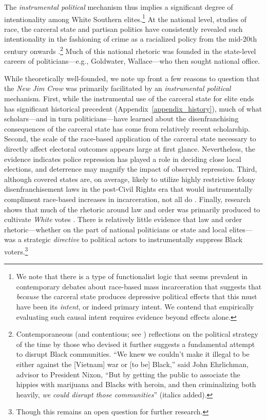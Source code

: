 \documentclass[12pt]{article}
\begin{document}
The \emph{instrumental political} mechanism thus implies a significant degree of intentionality among White Southern elites.\footnote{We note that there is a type of functionalist logic that seems prevalent in contemporary debates about race-based mass incarceration that suggests that \emph{because} the carceral state produces depressive political effects that this must have been its \emph{intent}, or indeed primary intent.  We contend that empirically evaluating such causal intent requires evidence beyond effects alone.}  At the national level, studies of race, the carceral state and partisan politics have consistently revealed such intentionality in the fashioning of crime as a racialized policy from the mid-20th century onwards \citep{Weaver:2007vr}.\footnote{Contemporaneous (and contentious; see \cite{LoBianco:2016wla}) reflections on the political strategy of the time by those who devised it further suggests a fundamental attempt to disrupt Black communities.  ``We knew we couldn't make it illegal to be either against the [Vietnam] war or [to be] Black,'' said John Ehrlichman, advisor to President Nixon, ``But by getting the public to associate the hippies with marijuana and Blacks with heroin, and then criminalizing both heavily, \emph{we could disrupt those communities}'' \citep{Baum:2016uy} (italics added).}  Much of this national rhetoric was founded in the state-level careers of politicians---e.g., Goldwater, Wallace---who then sought national office.

While theoretically well-founded, we note up front a few reasons to question that the \emph{New Jim Crow} was primarily facilitated by an \emph{instrumental political} mechanism.  First, while the instrumental use of the carceral state for elite ends has significant historical precedent (Appendix~\ref{appendix_history}),  much of what scholars---and in turn politicians---have learned about the disenfranchising consequences of the carceral state has come from relatively recent scholarship.  Second, the scale of the race-based application of the carceral state necessary to directly affect electoral outcomes appears large at first glance.  Nevertheless, the evidence indicates police repression has played a role in deciding close local elections, and deterrence may magnify the impact of observed repression.  Third, although covered states are, on average, likely to utilize highly restrictive felony disenfranchisement laws in the post-Civil Rights era that would instrumentally compliment race-based increases in incarceration, not all do \citep{Behrens:2003th}. Finally, research shows that much of the rhetoric around law and order was primarily produced to cultivate \emph{White} votes \citep{Phillips:1969tb,Lopez:2015vp}.  There is relatively little evidence that law and order rhetoric---whether on the part of national politicians or state and local elites---was a strategic \emph{directive} to political actors to instrumentally suppress Black voters.\footnote{Though this remains an open question for further research.}
\end{document}
